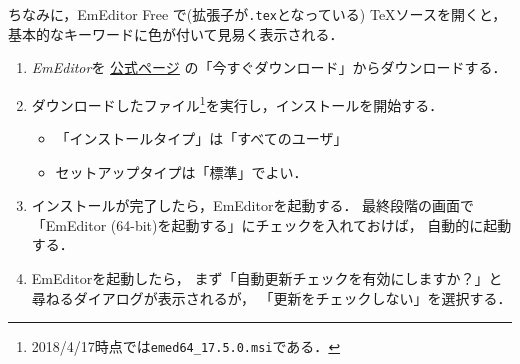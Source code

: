 \documentclass{ltjsarticle}
\begin{document}
ちなみに，EmEditor Free で(拡張子が\texttt{.tex}となっている) \TeX ソースを開くと，
基本的なキーワードに色が付いて見易く表示される．

\begin{enumerate}
\item \emph{EmEditor}を
  \href{http://jp.emeditor.com/}{公式ページ}%
  の「今すぐダウンロード」からダウンロードする．%
\item ダウンロードしたファイル\footnote{2018/4/17時点では\texttt{emed64\_17.5.0.msi}である．}を実行し，インストールを開始する．
  \begin{itemize}
  \item 「インストールタイプ」は「すべてのユーザ」
  \item セットアップタイプは「標準」でよい．%
  \end{itemize}

\item インストールが完了したら，EmEditorを起動する．
  最終段階の画面で「EmEditor (64-bit)を起動する」にチェックを入れておけば，
  自動的に起動する．

\item %
  EmEditorを起動したら，%
  まず「自動更新チェックを有効にしますか？」と尋ねるダイアログが表示されるが，
  「更新をチェックしない」を選択する．


\end{enumerate}
\end{document}
